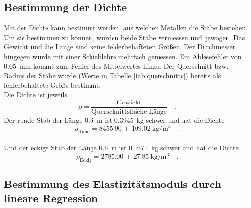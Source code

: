 \subsection{Bestimmung der Dichte}
Mit der Dichte kann bestimmt werden, aus welchen Metallen die Stäbe bestehen. Um sie bestimmen zu können, wurden beide Stäbe vermessen und gewogen. Das Gewicht und die Länge sind keine fehlerbehafteten Größen. Der Durchmesser hingegen wurde mit einer Schieblehre mehrfach gemessen. Ein Ablesefehler von \SI{0.05}{\milli\metre}  kommt zum Fehler des Mittelwertes hinzu.
Der Querschnitt bzw. Radius der Stäbe wurde (Werte in Tabelle \ref{tab:querschnitte}) bereits als fehlerbehaftete Größe bestimmt. \\
Die Dichte ist jeweils
\begin{equation}
  \rho = \frac{\text{Gewicht}}{\text{Querschnittsfläche} \cdot \text{Länge}} \quad.
\end{equation}
Der runde Stab der Länge \SI{0.6}{\metre} ist \SI{0.3945}{\kilo\gram} schwer und hat die Dichte
\begin{equation}
  \rho_\text{Rund} = \SI{8455.90(10902)}{\kilo\gram\per\cubic\metre} \quad.
\end{equation}  \\
Und der eckige Stab der Länge \SI{0.6}{\metre} ist \SI{0.1671}{\kilo\gram} schwer und hat die Dichte
\begin{equation}
  \rho_\text{Eckig} = \SI{2785.00(2785)}{\kilo\gram\per\cubic\metre} \quad.
\end{equation}





\pagebreak
\subsection{Bestimmung des Elastizitätsmoduls durch lineare Regression}
